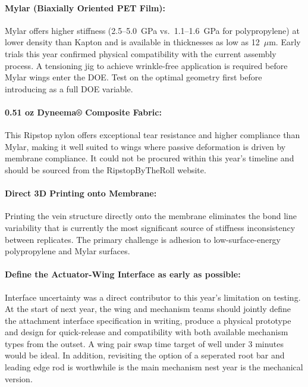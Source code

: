 \paragraph{Mylar (Biaxially Oriented PET Film):}
Mylar offers higher stiffness (2.5--5.0~GPa vs.\ 1.1--1.6~GPa for polypropylene) at lower density than Kapton and is available in thicknesses as low as 12~$\mu$m. Early trials this year confirmed physical compatibility with the current assembly process. A tensioning jig to achieve wrinkle-free application is required before Mylar wings enter the DOE. Test on the optimal geometry first before introducing as a full DOE variable.

\paragraph{0.51 oz Dyneema® Composite Fabric:}
This Ripstop nylon offers exceptional tear resistance and higher compliance than Mylar, making it well suited to wings where passive deformation is driven by membrane compliance. It could not be procured within this year's timeline and should be sourced from the RipstopByTheRoll website.

\paragraph{Direct 3D Printing onto Membrane:}
Printing the vein structure directly onto the membrane eliminates the bond line variability that is currently the most significant source of stiffness inconsistency between replicates. The primary challenge is adhesion to low-surface-energy polypropylene and Mylar surfaces.

\paragraph{Define the Actuator-Wing Interface as early as possible:}
Interface uncertainty was a direct contributor to this year's limitation on testing. At the start of next year, the wing and mechanism teams should jointly define the attachment interface specification in writing, produce a physical prototype and design for quick-release and compatibility with both available mechanism types from the outset. A wing pair swap time target of well under 3 minutes would be ideal. In addition, revisiting the option of a seperated root bar and leading edge rod is worthwhile is the main mechanism nest year is the mechanical version. 

